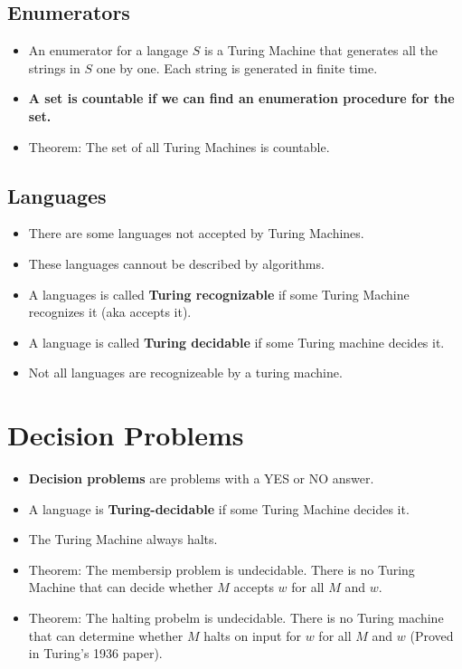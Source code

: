 \documentclass[a4paper]{article}
\begin{document}
\begin{multicols}{2}
	\subsection{Enumerators}
	\begin{itemize}
		\item An enumerator for a langage $S$ is a Turing Machine that generates
					all the strings in $S$ one by one. Each string is generated in finite
					time.
		\item \textbf{A set is countable if we can find an enumeration procedure for
					the set.}
		\item Theorem: The set of all Turing Machines is countable.
	\end{itemize}
	\subsection{Languages}
	\begin{itemize}
		\item There are some languages not accepted by Turing Machines.
		\item These languages cannout be described by algorithms.
		\item A languages is called \textbf{Turing recognizable} if some Turing
					Machine recognizes it (aka accepts it).
		\item A language is called \textbf{Turing decidable} if some Turing machine
					decides it.
		\item Not all languages are recognizeable by a turing machine.
	\end{itemize}

	\section{Decision Problems}
	\begin{itemize}
		\item \textbf{Decision problems} are problems with a YES or NO answer.
		\item A language is \textbf{Turing-decidable} if some Turing Machine decides
					it.
		\item The Turing Machine always halts.
		\item Theorem: The membersip problem is undecidable. There is no Turing
					Machine that can decide whether $M$ accepts $w$ for all $M$ and $w$.
		\item Theorem: The halting probelm is undecidable. There is no Turing
					machine that can determine whether $M$ halts on input for $w$ for all
					$M$ and $w$ (Proved in Turing's 1936 paper).
	\end{itemize}


\end{multicols}
\end{document}
